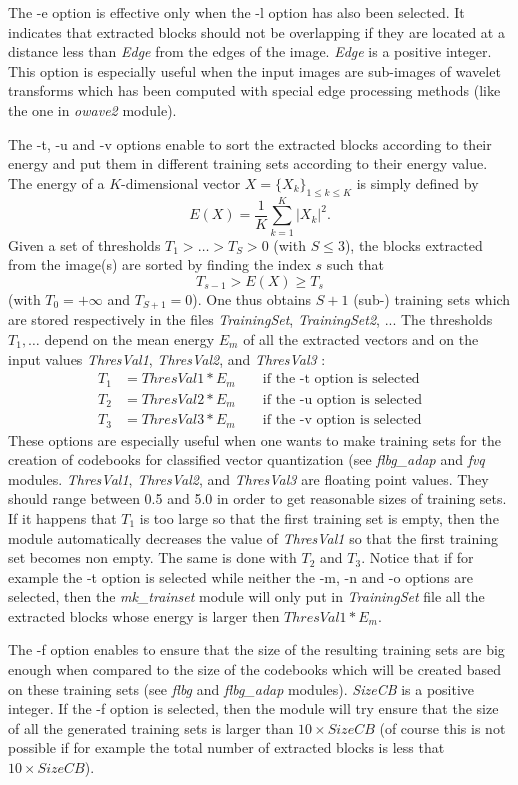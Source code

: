The -e option is effective only when the -l option has also been selected. 
It indicates that extracted blocks should not be overlapping if they 
are located at a distance less than {\em Edge} from the edges of the 
image. {\em Edge} is a positive integer. This option is especially useful when 
the input images are sub-images of wavelet transforms which has been 
computed with special edge processing methods (like the one in 
{\em owave2} module).

The -t, -u and -v options enable to sort the extracted blocks according 
to their energy and put them in different training sets according 
to their energy value. The energy of a $K$-dimensional vector 
$X=\{X_k\}_{1\leq k\leq K}$ is simply defined by
\[
E(X) = \frac{1}{K} \sum_{k=1}^K |X_k|^2.
\]
Given a set of thresholds $T_1>\ldots >T_S>0$ (with $S\leq 3$), 
the blocks extracted from the image(s) are sorted by finding the index $s$ 
such that 
\[
T_{s-1}> E(X) \geq T_s
\]
(with $T_0 = +\infty$ and $T_{S+1} = 0$). One thus obtains $S+1$ 
(sub-) training sets which are stored respectively in the files 
{\em TrainingSet}, {\em TrainingSet2}, ...
The thresholds $T_1, \ldots$ depend on the mean energy $E_{m}$ of all 
the extracted vectors and on the input values {\em ThresVal1}, 
{\em ThresVal2}, and {\em ThresVal3} :
\begin{eqnarray*} 
T_1 & = ThresVal1 * E_m \;\;\;\;\;\;\; \mbox{if the -t option is selected} \\
T_2 & = ThresVal2 * E_m \;\;\;\;\;\;\; \mbox{if the -u option is selected} \\
T_3 & = ThresVal3 * E_m \;\;\;\;\;\;\; \mbox{if the -v option is selected} 
\end{eqnarray*}
These options are especially useful when one wants to make training sets 
for the creation of codebooks for classified vector quantization (see 
{\em flbg\_adap} and {\em fvq} modules. {\em ThresVal1}, {\em ThresVal2}, 
and {\em ThresVal3} are floating point values. They should range 
between 0.5 and 5.0 in order to get reasonable sizes of training sets. 
If it happens that $T_1$ is too large so that the first training set is 
empty, then the module automatically decreases the value of {\em ThresVal1}
so that the first training set becomes non empty. The same is done 
with $T_2$ and $T_3$. Notice that if for example the -t option is selected 
while neither the -m, -n and -o options are selected, then 
the {\em mk\_trainset} module will only put in {\em TrainingSet} file 
all the extracted blocks whose energy is larger then $ThresVal1 * E_m$. 

The -f option enables to ensure that the size of the resulting training sets 
are big enough when compared to the size of the codebooks which will 
be created based on these training sets (see {\em flbg} and {\em flbg\_adap} 
modules). {\em SizeCB} is a positive integer. If the -f option 
is selected, then the module will try ensure that the size of 
all the generated training sets is larger than $10\times SizeCB$ 
(of course this is not possible if for example the total number of extracted 
blocks is less that $10\times SizeCB$). 
